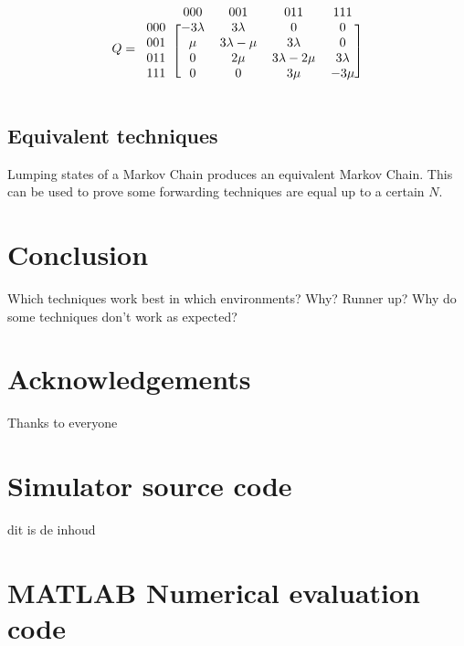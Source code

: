 \documentclass[10pt,a4paper,titlepage]{article}
\begin{document}
\[ Q =
  \begin{blockarray}{ccccc}
    & 000 & 001 & 011 & 111 \\
    \begin{block}{c[cccc]}
    000 & -3\lambda & 3\lambda & 0 & 0 \\
    001 & \mu & 3\lambda-\mu & 3\lambda & 0 \\
    011 & 0 & 2\mu & 3\lambda-2\mu & 3\lambda \\
    111 & 0 & 0 & 3\mu & -3\mu \\
    \end{block}
  \end{blockarray}
\]



\subsection{Equivalent techniques}
Lumping states of a Markov Chain produces an equivalent Markov Chain. This can be used to prove some forwarding techniques are equal up to a certain $N$.

\section{Conclusion}
Which techniques work best in which environments? Why? Runner up? Why do some techniques don't work as expected?

\section*{Acknowledgements}
Thanks to everyone

\printbibliography

\appendix
\section{Simulator source code}
\label{sourcecode}
dit is de inhoud

\section{MATLAB Numerical evaluation code}
\label{matlabcode}






\end{document}
